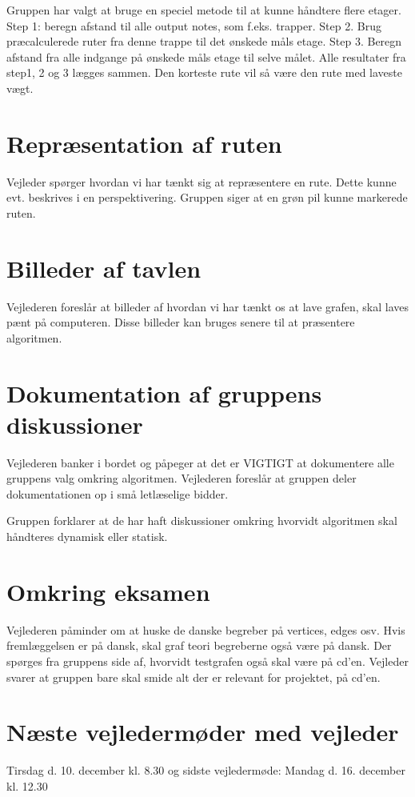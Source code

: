 \documentclass[article,11pt]{memoir}
\begin{document}
Gruppen har valgt at bruge en speciel metode til at kunne håndtere flere etager. Step 1: beregn afstand til alle output notes, som f.eks. trapper. Step 2. Brug præcalculerede ruter fra denne trappe til det ønskede måls etage. Step 3. Beregn afstand fra alle indgange på ønskede måls etage til selve målet. Alle resultater fra step1, 2 og 3 lægges sammen. Den korteste rute vil så være den rute med laveste vægt.

\section{Repræsentation af ruten}
Vejleder spørger hvordan vi har tænkt sig at repræsentere en rute. Dette kunne evt. beskrives i en perspektivering. Gruppen siger at en grøn pil kunne markerede ruten.

\section{Billeder af tavlen}
Vejlederen foreslår at billeder af hvordan vi har tænkt os at lave grafen, skal laves pænt på computeren. Disse billeder kan bruges senere til at præsentere algoritmen.

\section{Dokumentation af gruppens diskussioner}
Vejlederen banker i bordet og påpeger at det er VIGTIGT at dokumentere alle gruppens valg omkring algoritmen. Vejlederen foreslår at gruppen deler dokumentationen op i små letlæselige bidder.

Gruppen forklarer at de har haft diskussioner omkring hvorvidt algoritmen skal håndteres dynamisk eller statisk. 

\section{Omkring eksamen}
Vejlederen påminder om at huske de danske begreber på vertices, edges osv. Hvis fremlæggelsen er på dansk, skal graf teori begreberne også være på dansk. Der spørges fra gruppens side af, hvorvidt testgrafen også skal være på cd'en. Vejleder svarer at gruppen bare skal smide alt der er relevant for projektet, på cd'en.

\section{Næste vejledermøder med vejleder}
Tirsdag d. 10. december kl. 8.30 og sidste vejledermøde: Mandag d. 16. december kl. 12.30
\end{document}
